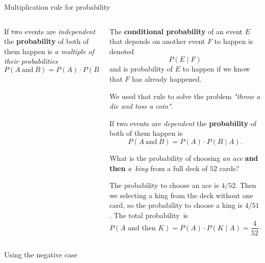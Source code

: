 \documentclass[9pt,aspectratio=169]{beamer}
\begin{document}
\begin{frame}{Multiplication rule for probability}
\begin{columns}[T]
\begin{column}{0.5\textwidth}
      \begin{definition}
        If two events are \emph{independent} the \textbf{probability} of both of them happen is \emph{a multiple of their probabilities}
        \[ P (A\ \text{and}\ B) = P (A) \cdot P (B). \] 
        \vspace*{-2ex} 
      \end{definition}
    \end{column}
    \begin{column}{0.5\textwidth}
      \begin{definition}
        The \textbf{conditional probability} of an event $E$ that depends on another event $F$ to happen is denoted 
        \[ P(E \mid F) \]
        and is probability of $E$ to happen if we know that $F$ has already happened.
      \end{definition}
      {\small We used that rule to solve the problem \emph{"throw a die and toss a coin"}.}
      \begin{definition}
        If two events are \emph{dependent} the \textbf{probability} of both of them happen is
        \[ P (A\ \text{and}\ B) = P (A) \cdot P (B \mid A). \] 
        \vspace*{-2.5ex} 
      \end{definition}
      {\small
        \begin{problem}
          What is the probability of choosing \emph{an ace} \textbf{and then} \emph{a~king} from a full deck of $52$ cards?
        \end{problem}
        The probability to choose an ace is $4/52$. Then we selecting a king from the deck without one card, so the probability to choose a king is $4/51$. The total probability~is
        \[ P(A \text{ and then } K) = P(A) \cdot P(K \mid A) = \frac{4}{52} \cdot \frac{4}{51} = \frac{4}{663}. \]
      }
    \end{column}
  \end{columns}
\end{frame}

\begin{frame}{Using the negative case}
  \begin{columns}[T]
    \begin{column}{0.5\textwidth}
    \end{column}
    \begin{column}{0.5\textwidth}
    \end{column}
  \end{columns}
\end{frame}
\end{document}
